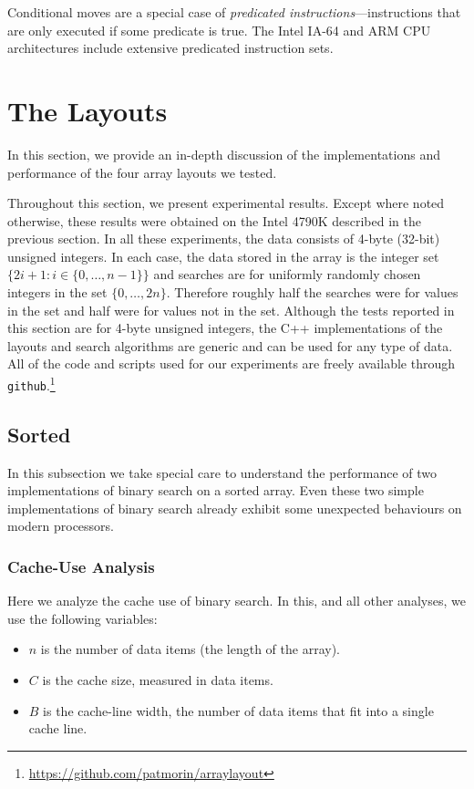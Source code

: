 \documentclass{patmorin}
\begin{document}
Conditional moves are a special case of \emph{predicated
instructions}---instructions that are only executed if some predicate
is true.  The Intel IA-64 and ARM CPU architectures include extensive
predicated instruction sets.

\section{The Layouts}

In this section, we provide an in-depth discussion of the implementations
and performance of the four array layouts we tested.

Throughout this section, we present experimental results. Except
where noted otherwise, these results were obtained on the Intel
4790K described in the previous section.  In all these experiments,
the data consists of 4-byte (32-bit) unsigned integers. In each
case, the data stored in the array is the integer set $\{2i+1:
i\in\{0,\ldots,n-1\}\}$ and searches are for uniformly randomly chosen
integers in the set $\{0,\ldots,2n\}$.  Therefore roughly half the
searches were for values in the set and half were for values not in
the set.  Although the tests reported in this section are for 4-byte
unsigned integers, the C++ implementations of the layouts and search
algorithms are generic and can be used for any type of data. All of the
code and scripts used for our experiments are freely available through
\texttt{github}.\footnote{\url{https://github.com/patmorin/arraylayout}}

\subsection{Sorted}

In this subsection we take special care to understand the performance of
two implementations of binary search on a sorted array.  Even these two
simple implementations of binary search already exhibit some unexpected
behaviours on modern processors.

\subsubsection{Cache-Use Analysis}

Here we analyze the cache use of binary search. In this, and all other
analyses, we use the following variables:

\begin{itemize}
  \item $n$ is the number of data items (the length of the array).
  \item $C$ is the cache size, measured in data items.
  \item $B$ is the cache-line width, the number of data items that fit
        into a single cache line.
\end{itemize}
\end{document}
